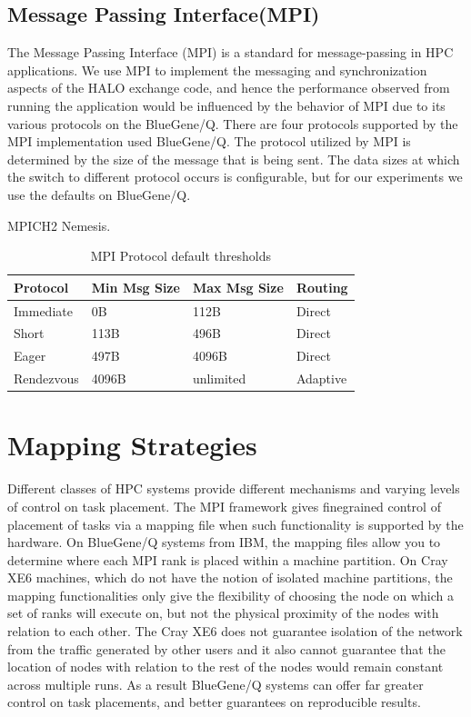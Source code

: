 \documentclass{acm_proc_article-sp}
\begin{document}
\subsection{Message Passing Interface(MPI)}
The Message Passing Interface (MPI) is a standard for message-passing in HPC applications.
We use MPI to implement the messaging and synchronization aspects of the HALO exchange code,
and hence the performance observed from running the application would be influenced by the behavior of MPI due to its various protocols on the BlueGene/Q.
There are four protocols supported by the MPI implementation used BlueGene/Q.
The protocol utilized by MPI is determined by the size of the message that is being sent.
The data sizes at which the switch to different protocol occurs is configurable, but for our experiments we use the defaults on BlueGene/Q.

MPICH2 Nemesis.

\begin{table}
  \caption{MPI Protocol default thresholds}
  {\footnotesize
    \begin{tabular}{ | l | l | l | p{1.5cm} |}
    \hline
    Protocol   & Min Msg Size   & Max Msg Size  & Routing\\ \hline
    Immediate  &             0B &           112B & Direct\\ \hline
    Short      &           113B &           496B & Direct\\ \hline
    Eager      &           497B &          4096B & Direct\\ \hline
    Rendezvous &          4096B &      unlimited & Adaptive\\ \hline
    \hline
    \end{tabular}
  }
\end{table}

\section{Mapping Strategies}


Different classes of HPC systems provide different mechanisms and varying levels of control on task placement.
The MPI framework gives finegrained control of placement of tasks via a mapping file when such functionality
is supported by the hardware. On BlueGene/Q systems from IBM, the mapping files allow you to determine where
each MPI rank is placed within a machine partition. On Cray XE6 machines, which do not have the notion of
isolated machine partitions, the mapping functionalities only give the flexibility of choosing the node on
which a set of ranks will execute on, but not the physical proximity of the nodes with relation to each other.
The Cray XE6 does not guarantee isolation of the network from the traffic generated by other users and it
also cannot guarantee that the location of nodes with relation to the rest of the nodes would remain constant
across multiple runs. As a result BlueGene/Q systems can offer far greater control on task placements, and
better guarantees on reproducible results.
\end{document}
